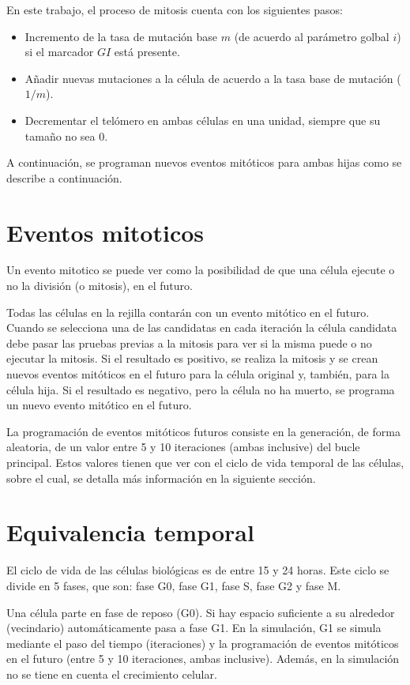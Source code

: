 En este trabajo, el proceso de mitosis cuenta con los siguientes pasos:

\begin{itemize}
    \item Incremento de la tasa de mutación base $m$ (de acuerdo al parámetro golbal $i$) si el marcador
    $GI$ está presente.
    \item Añadir nuevas mutaciones a la célula de acuerdo a la tasa base de mutación ($1/m$).
    \item Decrementar el telómero en ambas células en una unidad, siempre que su tamaño no sea 0.
\end{itemize}

A continuación, se programan nuevos eventos mitóticos para ambas hijas como se describe a continuación.

\section{Eventos mitoticos}

Un evento mitotico se puede ver como la posibilidad de que una célula ejecute o no la división (o mitosis),
en el futuro.

Todas las células en la rejilla contarán con un evento mitótico en el futuro. Cuando se selecciona una
de las candidatas en cada iteración la célula candidata debe pasar las pruebas previas a la mitosis para ver
si la misma puede o no ejecutar la mitosis. Si el resultado es positivo, se realiza la mitosis y se crean
nuevos eventos mitóticos en el futuro para la célula original y, también, para la célula hija.
Si el resultado es negativo, pero la célula no ha muerto, se programa un nuevo evento mitótico en el futuro.

La programación de eventos mitóticos futuros consiste en la generación, de forma aleatoria, de un valor
entre 5 y 10 iteraciones (ambas inclusive) del bucle principal. Estos valores tienen que ver con el ciclo de vida
temporal de las células, sobre el cual, se detalla más información en la siguiente sección.

\section{Equivalencia temporal}

El ciclo de vida de las células biológicas es de entre 15 y 24 horas. Este ciclo se divide en 5 fases, que son:
fase G0, fase G1, fase S, fase G2 y fase M.

Una célula parte en fase de reposo (G0). Si hay espacio suficiente a su alrededor (vecindario) automáticamente pasa
a fase G1. En la simulación, G1 se simula mediante el paso del tiempo (iteraciones) y la programación de
eventos mitóticos en el futuro (entre 5 y 10 iteraciones, ambas inclusive). Además, en la simulación no se
tiene en cuenta el crecimiento celular.

